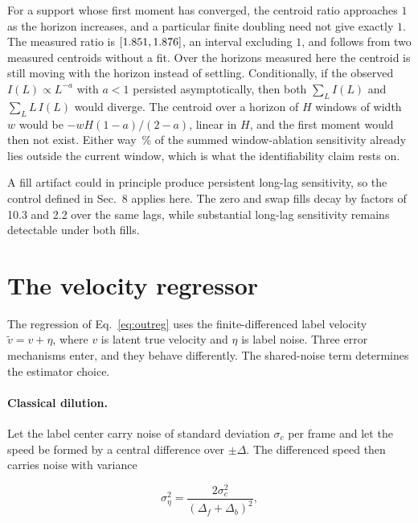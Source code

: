 \documentclass[10pt,twocolumn,letterpaper]{article}
\begin{document}
For a support whose first moment has converged, the centroid ratio approaches $1$ as the horizon
increases, and a
particular finite doubling need not give exactly $1$. The measured ratio is \tailRatio{}
$[1.851,1.876]$, an interval excluding $1$, and follows from
two measured centroids without a fit. Over the horizons measured here the centroid is
still moving with the horizon instead of settling. Conditionally, if the observed
$I(L)\propto L^{-a}$ with $a<1$ persisted asymptotically, then both $\sum_L I(L)$ and
$\sum_L L\,I(L)$ would diverge. The centroid over a horizon of $H$ windows of width $w$
would be $-wH(1-a)/(2-a)$, linear in $H$, and the first moment would then not exist. Either way
\tailOutside\,\% of the summed window-ablation sensitivity already lies outside the current window, which is
what the identifiability claim rests on.

A fill artifact could in principle produce persistent long-lag sensitivity, so the control
defined in Sec.~8 applies here. The zero and swap fills decay by factors of 10.3 and 2.2 over
the same lags, while substantial long-lag sensitivity remains detectable under both fills.

\section{The velocity regressor}
\label{sup:denominator}

The regression of Eq.~\ref{eq:outreg} uses the finite-differenced label velocity
$\tilde v=v+\eta$, where $v$ is latent true velocity and $\eta$ is label noise.
Three error mechanisms enter, and they behave differently. The shared-noise term
determines the estimator choice.

\paragraph{Classical dilution.} Let the label center carry noise of standard
deviation $\sigma_{c}$ per frame and let the speed be formed by a central
difference over $\pm\Delta$. The differenced speed then carries noise with variance

\begin{equation}
\sigma_{\eta}^{2}=\frac{2\sigma_{c}^{2}}{(\Delta_f+\Delta_b)^{2}},
\label{eq:dilution}
\end{equation}
\end{document}
